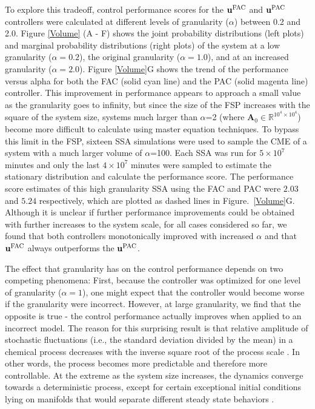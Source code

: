 \documentclass[12pt]{iopart}
\begin{document}
To explore this tradeoff, control performance scores for the $\mathbf{u}^{\rm FAC}$ and $\mathbf{u}^{\rm PAC}$ controllers were calculated at different levels of granularity ($\alpha$) between 0.2 and 2.0.  Figure \ref{Volume} (A - F) shows the joint probability distributions (left plots) and marginal probability distributions (right plots) of the system at a low granularity ($\alpha=0.2$), the original granularity ($\alpha=1.0$), and at an increased granularity ($\alpha=2.0$). 
Figure \ref{Volume}G shows the trend of the performance versus alpha for both the FAC (solid cyan line) and the PAC (solid magenta line) controller.  This improvement in performance appears to approach a small value as the granularity goes to infinity, but since the size of the FSP increases with the square of the system size, systems much larger than $\alpha$=2 (where $\mathbf{A}_0\in \mathbb{R}^{10^4\times10^4}$) become more difficult to calculate using master equation techniques. To bypass this limit in the FSP, sixteen SSA simulations were used to sample the CME of a system with a much larger volume of $\alpha$=100. Each SSA was run for $5\times10^7$ minutes and only the last $4\times10^7$ minutes were sampled to estimate the stationary distribution and calculate the performance score. The performance score estimates of this high granularity SSA using the FAC and PAC were $2.03$ and $5.24$ respectively, which are plotted as dashed lines in Figure.\ \ref{Volume}G. Although it is unclear if further performance improvements could be obtained with further increases to the system scale, for all cases considered so far, we found that both controllers monotonically improved with increased $\alpha$ and that $\mathbf{u}^{\rm FAC}$ always outperforms the $\mathbf{u}^{\rm PAC}$. 

The effect that granularity has on the control performance depends on two competing phenomena: First, because the controller was optimized for one level of granularity ($\alpha = 1$), one might expect that the controller would become worse if the granularity were incorrect. However, at large granularity, we find that the opposite is true - the control performance actually improves when applied to an incorrect model. The reason for this surprising result is that relative amplitude of stochastic fluctuations (i.e., the standard deviation divided by the mean) in a chemical process decreases with the inverse square root of the process scale . In other words, the process becomes more predictable and therefore more controllable. At the extreme as the system size increases, the dynamics converge towards a deterministic process, except for certain exceptional initial conditions lying on manifolds that would separate different steady state behaviors . 
\end{document}
